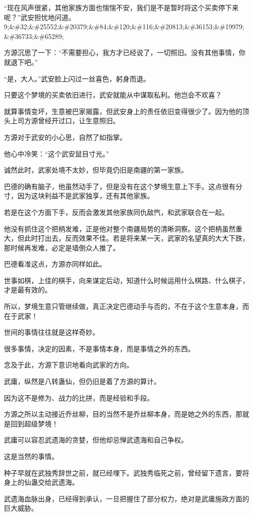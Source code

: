 \begin{this_body}
“现在风声很紧，其他家族方面也惴惴不安，我们是不是暂时将这个买卖停下来呢？”武安担忧地问道。9;\&\#32;\&\#25552;\&\#20379;\&\#84;\&\#120;\&\#116;\&\#20813;\&\#36153;\&\#19979;\&\#36733;\&\#65289;

方源沉思了一下：“不需要担心，我方才已经说了，一切照旧。没有其他事情，你就退下吧。”

“是，大人。”武安脸上闪过一丝喜色，躬身而退。

只要这个梦境的买卖依旧进行，武安就能从中谋取私利。他岂会不欢喜？

就算事情变坏，生意被巴家揭露，但武安身上的责任依旧变得很少了。因为他的顶头上司方源曾经开过口，让生意照旧。

方源对于武安的小心思，自然了如指掌。

他心中冷笑：“这个武安鼠目寸光。”

诚然此时，武家处境不太妙，但毕竟仍旧是南疆的第一家族。

巴德的确有脑子，他虽然动手了，但是没有在这个梦境生意上下手。这点很有分寸，因为这块利益不是武家独享，还有其他家族。

若是在这个方面下手，反而会激发其他家族同仇敌忾，和武家联合在一起。

他没有抓住这个把柄发难，正是他对整个南疆局势的清晰洞察。这个把柄虽然重大，但此时打出去，反而效果不佳。若是将来某一天，武家的名望真的大大下跌，那时候再发难，必定是墙倒众人推了。

巴德看准这点，方源亦同样如此。

世事如棋，上佳的棋手，向来谋定后动，知道什么时候运用什么棋路、什么棋子，才是最有效的。

所以，梦境生意只管继续做，真正决定巴德动手与否的，不在于这个生意本身，而在于武家！

世间的事情往往就是这样奇妙。

很多事情，决定的因素，不是事情本身，而是事情之外的东西。

念及于此，方源下意识地看向武家的方向。

武庸，纵然是八转蛊仙，但仍旧是着了方源的算计。

因为这不是修为、战力的比拼，而是经验和手段。

方源之所以主动接近乔丝柳，目的当然不是乔丝柳本身，而是她之外的东西，那就是回到超级梦境！

武庸可以容忍武遗海的贪婪，但他却忌惮武遗海和自己争权。

这是当然的事情。

种子早就在武独秀辞世之前，就已经埋下。武独秀临死之前，曾经留下遗言，要将身上的仙蛊交给武遗海。

武遗海血脉出身，已经得到承认，一旦把握住了部分权力，绝对是武庸施政方面的巨大威胁。


\end{this_body}
